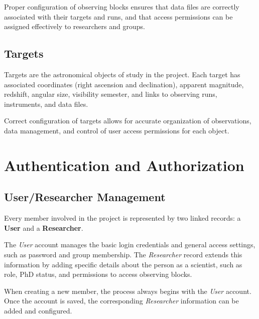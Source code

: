 
Proper configuration of observing blocks ensures that data files are correctly associated with their targets and runs, and that access permissions can be assigned effectively to researchers and groups.

\subsection{Targets}

Targets are the astronomical objects of study in the project. Each target has associated coordinates (right ascension and declination), apparent magnitude, redshift, angular size, visibility semester, and links to observing runs, instruments, and data files.


Correct configuration of targets allows for accurate organization of observations, data management, and control of user access permissions for each object.


\section{Authentication and Authorization}

\subsection{User/Researcher Management}

Every member involved in the project is represented by two linked records: a \textbf{User} and a \textbf{Researcher}.

The \textsl{User} account manages the basic login credentials and general access settings, such as password and group membership. The \textsl{Researcher} record extends this information by adding specific details about the person as a scientist, such as role, PhD status, and permissions to access observing blocks.

When creating a new member, the process always begins with the \textsl{User} account. Once the account is saved, the corresponding \textsl{Researcher} information can be added and configured.


